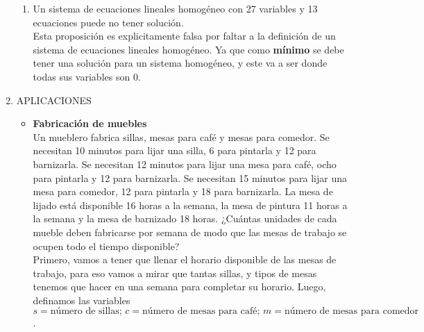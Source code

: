\documentclass{article}
\begin{document}
\begin{enumerate}
\begin{enumerate}[label=\listAlph]
			\item Un sistema de ecuaciones lineales homogéneo con 27 variables y 13 ecuaciones puede no tener solución. \\
                Esta proposición es explicitamente falsa por faltar a la definición de un sistema de ecuaciones lineales homogéneo. 
                Ya que como \textbf{mínimo} se debe tener una solución para un sistema homogéneo, y este va a ser donde todas sus variables son 0.
        \end{enumerate}
    \item APLICACIONES
        \begin{itemize}
            \item \textbf{Fabricación de muebles} \\
                Un mueblero fabrica sillas, mesas para café y mesas para comedor. Se necesitan 10 minutos para lijar
                una silla, 6 para pintarla y 12 para barnizarla. Se necesitan 12 minutos para lijar una mesa para café,
                ocho para pintarla y 12 para barnizarla. Se necesitan 15 minutos para lijar una mesa para comedor,
                12 para pintarla y 18 para barnizarla. La mesa de lijado está disponible 16 horas a la semana, la mesa
                de pintura 11 horas a la semana y la mesa de barnizado 18 horas. 
                ¿Cuántas unidades de cada mueble deben fabricarse por semana de modo que las mesas de trabajo se ocupen todo el tiempo disponible?
                \\[1ex]
                Primero, vamos a tener que llenar el horario disponible de las mesas de trabajo, para eso vamos a mirar que tantas sillas, y tipos de 
                mesas tenemos que hacer en una semana para completar su horario. Luego, definamos las variables \(s = \text{número de sillas; } c = \text{número de mesas para café; } m = \text{número de mesas para comedor}\).

\end{itemize}
\end{enumerate}
\end{document}
